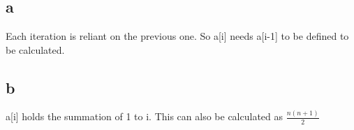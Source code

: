 \documentclass [11pt]{article}
\begin{document}
\section{ }
\subsection{a}
Each iteration is reliant on the previous one. So a[i] needs a[i-1] to be defined to be calculated.
\subsection{b}
a[i] holds the summation of 1 to i.  This can also be calculated as $\frac{n(n+1)} {2}$
\end{document}
